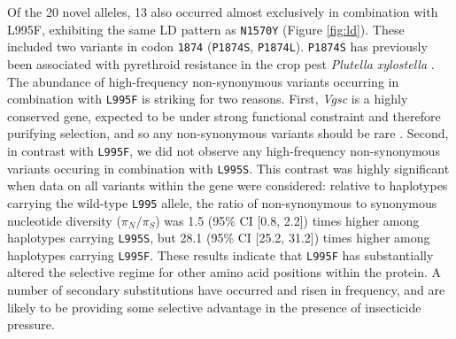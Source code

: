 \documentclass[a4paper,11pt,abstracton,hidelinks]{scrartcl}
\begin{document}
%
Of the 20 novel alleles, 13 also occurred almost exclusively in combination with L995F, exhibiting the same LD pattern as \texttt{N1570Y} (Figure \ref{fig:ld}).
%
These included two variants in codon \texttt{1874} (\texttt{P1874S}, \texttt{P1874L}).
%
\texttt{P1874S} has previously been associated with pyrethroid resistance in the crop pest \textit{Plutella xylostella} \cite{Sonoda2008}.
%
The abundance of high-frequency non-synonymous variants occurring in combination with \texttt{L995F} is striking for two reasons.
%
First, \textit{Vgsc} is a highly conserved gene, expected to be under strong functional constraint and therefore purifying selection, and so any non-synonymous variants should be rare \cite{Davies2007b}.
%
Second, in contrast with \texttt{L995F}, we did not observe any high-frequency non-synonymous variants occuring in combination with \texttt{L995S}.
%
This contrast was highly significant when data on all variants within the gene were considered: relative to haplotypes carrying the wild-type \texttt{L995} allele, the ratio of non-synonymous to synonymous nucleotide diversity ($\pi_{N}/\pi_{S}$) was 1.5 (95\% CI [0.8, 2.2]) times higher among haplotypes carrying \texttt{L995S}, but 28.1 (95\% CI [25.2, 31.2]) times higher among haplotypes carrying \texttt{L995F}.
%
These results indicate that \texttt{L995F} has substantially altered the selective regime for other amino acid positions within the protein.
%
A number of secondary substitutions have occurred and risen in frequency, and are likely to be providing some selective advantage in the presence of insecticide pressure.
\end{document}
